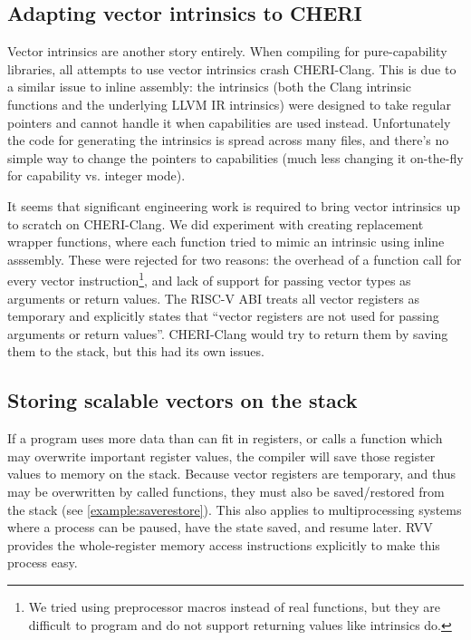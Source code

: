 \documentclass[../thesis]{subfiles}
\begin{document}
\subsection{Adapting vector intrinsics to CHERI}
Vector intrinsics are another story entirely.
When compiling for pure-capability libraries, all attempts to use vector intrinsics crash CHERI-Clang.
This is due to a similar issue to inline assembly: the intrinsics (both the Clang intrinsic functions and the underlying LLVM IR intrinsics) were designed to take regular pointers and cannot handle it when capabilities are used instead.
Unfortunately the code for generating the intrinsics is spread across many files, and there's no simple way to change the pointers to capabilities (much less changing it on-the-fly for capability vs. integer mode).

It seems that significant engineering work is required to bring vector intrinsics up to scratch on CHERI-Clang.
We did experiment with creating replacement wrapper functions, where each function tried to mimic an intrinsic using inline asssembly.
These were rejected for two reasons: the overhead of a function call for every vector instruction\footnote{We tried using preprocessor macros instead of real functions, but they are difficult to program and do not support returning values like intrinsics do.}, and lack of support for passing vector types as arguments or return values.
The RISC-V ABI treats all vector registers as temporary and explicitly states that \enquote{vector registers are not used for passing arguments or return values}\cite{specification-RISCV-ABI-v1.0rc2}.
CHERI-Clang would try to return them by saving them to the stack, but this had its own issues.


\subsection{Storing scalable vectors on the stack}
If a program uses more data than can fit in registers, or calls a function which may overwrite important register values, the compiler will save those register values to memory on the stack.
Because vector registers are temporary, and thus may be overwritten by called functions, they must also be saved/restored from the stack (see \cref{example:saverestore}).
This also applies to multiprocessing systems where a process can be paused, have the state saved, and resume later.
RVV provides the whole-register memory access instructions explicitly to make this process easy\cite[Section 7.9]{specification-RVV-v1.0}.
\end{document}
